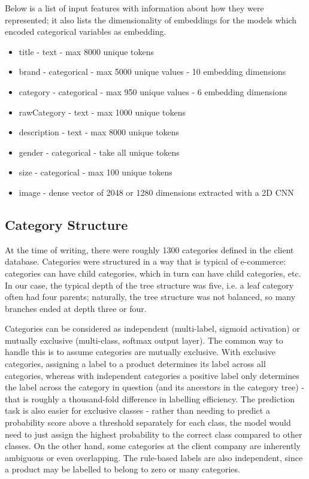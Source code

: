 Below is a list of input features with information about how they were represented; it also lists the dimensionality of embeddings  for the models which  encoded categorical variables as embedding.

\begin{itemize}[noitemsep]
  \item title - text - max 8000 unique tokens
  \item brand - categorical - max 5000 unique values - 10 embedding dimensions
  \item category - categorical - max 950 unique values - 6 embedding dimensions
  \item rawCategory - text - max 1000 unique tokens
  \item description - text - max 8000 unique tokens
  \item gender - categorical - take all unique tokens
  \item size - categorical - max 100 unique tokens
  \item image - dense vector of 2048 or 1280 dimensions extracted with a 2D CNN
\end{itemize}

\subsection{Category Structure}
\label{cat_tree}

At the time of writing, there were roughly 1300 categories defined in the client database.
Categories were structured in a way that is typical of  e-commerce:  categories can have  child categories, which in turn can have child categories, etc.
In our case, the typical depth of the tree structure was five, i.e. a leaf category often had four parents;  naturally, the tree structure was not balanced, so many branches ended at depth three or four.

Categories can be considered as independent (multi-label, sigmoid activation) or mutually exclusive (multi-class, softmax output layer).
The common way to handle this is to assume categories are mutually exclusive.
With exclusive categories, assigning a label to a product determines its label across all categories, whereas with independent categories a positive label only determines the label across the category in question (and its ancestors in the category tree) - that is roughly a thousand-fold difference in labelling efficiency.
The prediction task is also easier for exclusive classes - rather than needing to predict a probability score above a threshold separately for each class, the model would need to just assign the highest probability to the correct class compared to other classes.
On the other hand, some categories at the client company are inherently ambiguous or even overlapping.
The rule-based labels are also independent, since a product may be labelled to belong to zero or many categories.

